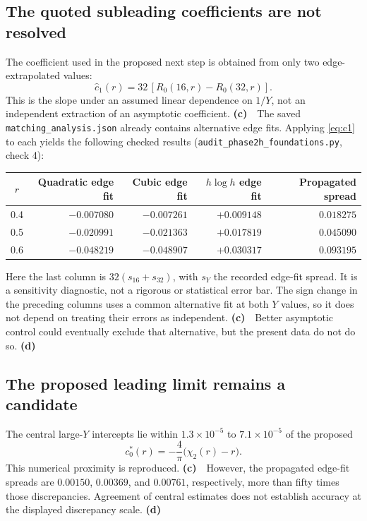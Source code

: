 \documentclass[11pt,a4paper]{article}
\newcommand{\Lc}{\textsf{\textbf{(c)}}\ }
\newcommand{\Ld}{\textsf{\textbf{(d)}}\ }
\newcommand{\scr}{\texttt{audit\_\allowbreak phase2h\_\allowbreak foundations.py}}
\begin{document}
\subsection{The quoted subleading coefficients are not resolved}
The coefficient used in the proposed next step is obtained from only two
edge-extrapolated values:
\begin{equation}
 \widehat c_1(r)=32\,[R_0(16,r)-R_0(32,r)].
 \label{eq:c1}
\end{equation}
This is the slope under an assumed linear dependence on $1/Y$, not an
independent extraction of an asymptotic coefficient. \Lc\ The saved
\texttt{matching\_analysis.json} already contains alternative edge fits.
Applying \eqref{eq:c1} to each yields the following checked results
(\scr, check 4):
\begin{center}\small
\begin{tabular}{@{}crrrr@{}}\toprule
$r$ & Quadratic edge fit & Cubic edge fit & $h\log h$ edge fit
 & Propagated spread\\\midrule
0.4 & $-0.007080$ & $-0.007261$ & $+0.009148$ & $0.018275$\\
0.5 & $-0.020991$ & $-0.021363$ & $+0.017819$ & $0.045090$\\
0.6 & $-0.048219$ & $-0.048907$ & $+0.030317$ & $0.093195$\\\bottomrule
\end{tabular}
\end{center}
Here the last column is $32(s_{16}+s_{32})$, with $s_Y$ the recorded edge-fit
spread. It is a sensitivity diagnostic, not a rigorous or statistical error
bar. The sign change in the preceding columns uses a common alternative fit
at both $Y$ values, so it does not depend on treating their errors as
independent. \Lc\ Better asymptotic control could eventually exclude that
alternative, but the present data do not do so. \Ld

\subsection{The proposed leading limit remains a candidate}
The central large-$Y$ intercepts lie within $1.3\times10^{-5}$ to
$7.1\times10^{-5}$ of the proposed
\[
 c_0^*(r)=-\frac4\pi\big(\chi_2(r)-r\big).
\]
This numerical proximity is reproduced. \Lc\ However, the propagated
edge-fit spreads are $0.00150$, $0.00369$, and $0.00761$, respectively,
more than fifty times those discrepancies. Agreement of central estimates
does not establish accuracy at the displayed discrepancy scale. \Ld
\end{document}
